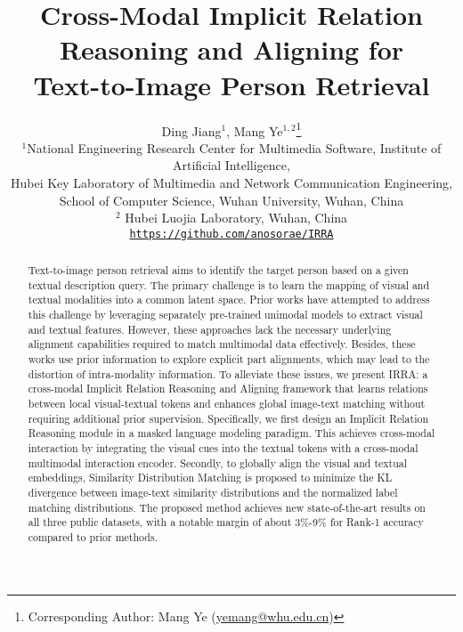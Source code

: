 \documentclass[10pt,twocolumn,letterpaper]{article}
\begin{document}
\title{Cross-Modal Implicit Relation Reasoning and Aligning for \\ Text-to-Image Person Retrieval}

\author{
Ding Jiang$^{1}$, \hspace{2pt} 
Mang Ye$^{1,2}$\thanks{Corresponding Author: Mang Ye (\href{mailto:yemang@whu.edu.cn}{yemang@whu.edu.cn})} \hspace{2pt}
\\ $^{1}$National Engineering Research Center for Multimedia Software, Institute of Artificial Intelligence,
\\ Hubei Key Laboratory of Multimedia and Network Communication Engineering, 
\\School of Computer Science, Wuhan University, Wuhan, China\\
$^{2}$ Hubei Luojia Laboratory, Wuhan, China\\
{\tt\small \href{https://github.com/anosorae/IRRA}{https://github.com/anosorae/IRRA}}
}

\maketitle

\begin{abstract}
  Text-to-image person retrieval aims to identify the target person based on a given textual description query.
  The primary challenge is to learn the mapping of visual and textual modalities into a common latent space. 
  Prior works have attempted to address this challenge by leveraging separately pre-trained unimodal models to extract visual and textual features. However, these approaches lack the necessary underlying alignment capabilities required to match multimodal data effectively. Besides, these works use prior information to explore explicit part alignments, which may lead to the distortion of intra-modality information. 
  To alleviate these issues, we present IRRA: a cross-modal Implicit Relation Reasoning and Aligning framework that learns relations between local visual-textual tokens and enhances global image-text matching without requiring additional prior supervision. 
  Specifically, we first design an Implicit Relation Reasoning module in a masked language modeling paradigm. This achieves cross-modal interaction by integrating the visual cues into the textual tokens with a cross-modal multimodal interaction encoder.
  Secondly, to globally align the visual and textual embeddings, Similarity Distribution Matching is proposed to minimize the KL divergence between image-text similarity distributions and the normalized label matching distributions. The proposed method achieves new state-of-the-art results on all three public datasets, with a notable margin of about 3\%-9\% for Rank-1 accuracy compared to prior methods.
\end{abstract}
\end{document}
